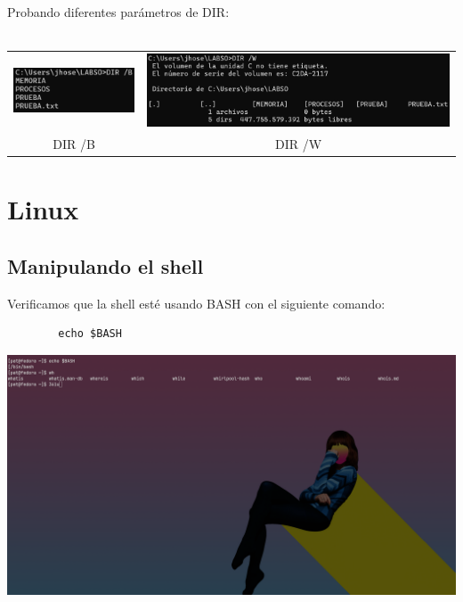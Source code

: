 \documentclass{article}
\begin{document}
        Probando diferentes parámetros de DIR: \\ \\
        \begin{tabular}{cc}
        \includegraphics[width=.4\linewidth,valign=m]{WindowsCapturas/DIRB.png} & \includegraphics[width=.6\linewidth,valign=m]{WindowsCapturas/DIRW.png} \\
        DIR /B & DIR /W \\
    \end{tabular}

\section{Linux}

\subsection{Manipulando el shell}
Verificamos que la shell esté usando BASH con el siguiente comando:
        \begin{verbatim}
        echo $BASH
        \end{verbatim}
        \includegraphics[scale=0.25,trim={0 30cm 0 0},clip]
        {LinuxCapturas/echo-wh.png}
        
\end{document}
